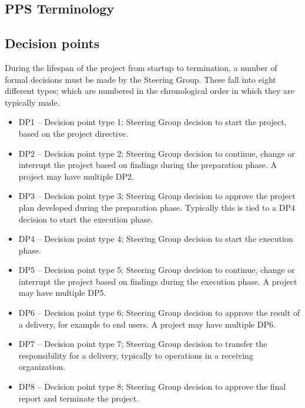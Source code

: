 \documentclass{article}
\begin{document}
\newpage
\begin{appendices}
\section{PPS Terminology}

\subsection{Decision points}
During the lifespan of the project from startup to termination, a number of formal decisions must be made by the Steering Group. These fall into eight different types; which are numbered in the chronological order in which they are typically made.
\begin{itemize}

\item DP1 – Decision point type 1; Steering Group decision to start the project, based on the project directive.

\item DP2 – Decision point type 2; Steering Group decision to continue, change or interrupt the project based on findings during the preparation phase. A project may have multiple DP2.

\item DP3 – Decision point type 3; Steering Group decision to approve the project plan developed during the preparation phase. Typically this is tied to a DP4 decision to start the execution phase.

\item DP4 – Decision point type 4; Steering Group decision to start the execution phase.

\item DP5 – Decision point type 5; Steering Group decision to continue, change or interrupt the project based on findings during the execution phase. A project may have multiple DP5.

\item DP6 – Decision point type 6; Steering Group decision to approve the result of a delivery, for example to end users. A project may have multiple DP6.

\item DP7 – Decision point type 7; Steering Group decision to transfer the responsibility for a delivery, typically to operations in a receiving organization.

\item DP8 – Decision point type 8; Steering Group decision to approve the final report and terminate the project.


\end{itemize}
\end{appendices}
\end{document}

